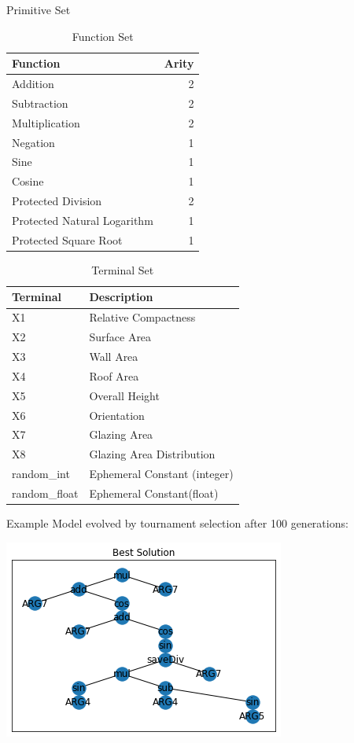 \documentclass[
  ignorenonframetext,
]{beamer}
\begin{document}
\begin{frame}[allowframebreaks]{Primitive Set}
\protect\hypertarget{primitive-set}{}
\begin{table}

\caption{\label{tab:unnamed-chunk-4}Function Set}
\centering
\begin{tabular}[t]{l|r}
\hline
Function & Arity\\
\hline
Addition & 2\\
\hline
Subtraction & 2\\
\hline
Multiplication & 2\\
\hline
Negation & 1\\
\hline
Sine & 1\\
\hline
Cosine & 1\\
\hline
Protected Division & 2\\
\hline
Protected Natural Logarithm & 1\\
\hline
Protected Square Root & 1\\
\hline
\end{tabular}
\end{table}
\framebreak

\begin{table}

\caption{\label{tab:unnamed-chunk-5}Terminal Set}
\centering
\begin{tabular}[t]{l|l}
\hline
Terminal & Description\\
\hline
X1 & Relative Compactness\\
\hline
X2 & Surface Area\\
\hline
X3 & Wall Area\\
\hline
X4 & Roof Area\\
\hline
X5 & Overall Height\\
\hline
X6 & Orientation\\
\hline
X7 & Glazing Area\\
\hline
X8 & Glazing Area Distribution\\
\hline
random\_int & Ephemeral Constant (integer)\\
\hline
random\_float & Ephemeral Constant(float)\\
\hline
\end{tabular}
\end{table}
\end{frame}

\begin{frame}{Example}
\protect\hypertarget{example}{}
Model evolved by tournament selection after 100 generations:

\includegraphics{../plots/example_model.png}
\end{frame}
\end{document}
